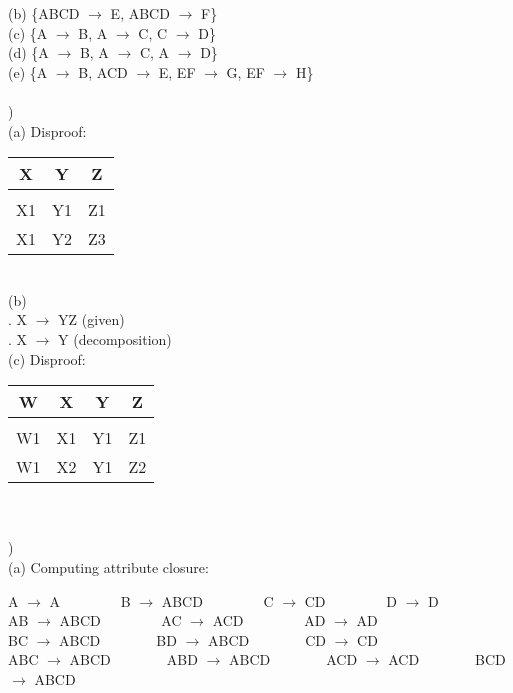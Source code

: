 \documentclass[12pt]{article}
\begin{document}
\indent \indent (b) \{ABCD $\rightarrow$ E, ABCD $\rightarrow$ F\}\\

\indent \indent (c) \{A $\rightarrow$ B, A $\rightarrow$ C, C $\rightarrow$ D\}\\

\indent \indent (d) \{A $\rightarrow$ B, A $\rightarrow$ C, A $\rightarrow$ D\}\\

\indent \indent (e) \{A $\rightarrow$ B, ACD $\rightarrow$ E, EF $\rightarrow$ G, EF $\rightarrow$ H\}\\


\hrulefill\\


) \\
\indent \indent (a) Disproof:
\begin{tabular}{ccc}
 X & Y & Z\\
 \hline &&\\[-1em]
X1 & Y1 & Z1\\
X1 & Y2 & Z3\\
\end{tabular}\\

\indent \indent (b) \\
\indent \indent {}. X $\rightarrow$ YZ (given)\\
\indent \indent {}. X $\rightarrow$ Y (decomposition) \checkmark\\

\indent \indent (c) Disproof:
\begin{tabular}{cccc}
 W & X & Y & Z\\
 \hline &&\\[-1em]
W1 & X1 & Y1 & Z1\\
W1 & X2 & Y1 & Z2\\
\end{tabular}\\


\hrulefill\\


)\\
\indent \indent (a) Computing attribute closure:
\begin{center}
A $\rightarrow$ A \ \ \ \ \ \ \ \ 
B $\rightarrow$ ABCD \ \ \ \ \ \ \ \  
C $\rightarrow$ CD \ \ \ \ \ \ \ \ 
D $\rightarrow$ D\\

AB $\rightarrow$ ABCD \ \ \ \ \ \ \ \ 
AC $\rightarrow$ ACD \ \ \ \ \ \ \ \ 
AD $\rightarrow$ AD \\

BC $\rightarrow$ ABCD\ \ \ \ \ \ \ \ 
BD $\rightarrow$ ABCD\ \ \ \ \ \ \ \ 
CD $\rightarrow$ CD\\

ABC $\rightarrow$ ABCD\ \ \ \ \ \ \ \ 
ABD $\rightarrow$ ABCD\ \ \ \ \ \ \ \ 
ACD $\rightarrow$ ACD\ \ \ \ \ \ \ \ 
BCD $\rightarrow$ ABCD\\
\end{center}
\end{document}
